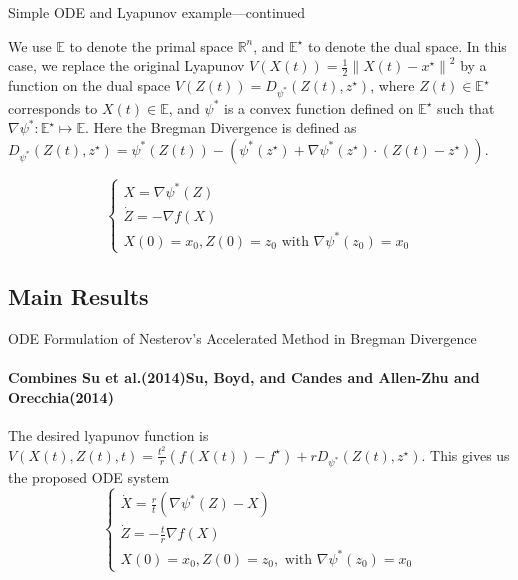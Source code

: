 \documentclass[english]{beamer}
\begin{document}
\begin{frame}{Simple ODE and Lyapunov example---continued}
\begin{block}{}
We use $\mathbb{E}$ to denote the primal space $\mathbb{R}^{n}$, and $\mathbb{E^{\star}}$ to denote the dual space. In this case, we replace the original Lyapunov $V(X(t))=\frac{1}{2}\left\|X(t)-x^{\star}\right\|^{2}$ by a function on the dual space $V(Z(t))=D_{\psi^{*}}\left(Z(t), z^{\star}\right)$, where $Z(t) \in \mathbb{E^{\star}}$ corresponds to $X(t) \in \mathbb{E}$, and $\psi^{*}$ is a convex function defined on $\mathbb{E^{\star}}$ such that $\nabla \psi^{*}: \mathbb{E^{\star}}\mapsto \mathbb{E}$. Here the Bregman Divergence is defined as $D_{\psi^{*}}\left(Z(t), z^{\star}\right) = \psi^{*}(Z(t))-(\psi^{*}(z^{\star})+\nabla \psi^{*}(z^{\star}) \cdot(Z(t)-z^{\star}))$.
\end{block}

\begin{block}{}
\begin{equation*}
    \left\{\begin{array}{l}
    X=\nabla \psi^{*}(Z) \\
    \dot{Z}=-\nabla f(X) \\
    X(0)=x_{0}, Z(0)=z_{0} \text { with } \nabla \psi^{*}\left(z_{0}\right)=x_{0}
    \end{array}\right.
\end{equation*}
\end{block}
\end{frame}

\subsection{Main Results}
\begin{frame}{ODE Formulation of Nesterov's Accelerated Method in Bregman Divergence}
\framesubtitle{Combines Su et al.(2014)Su, Boyd, and Candes and Allen-Zhu and Orecchia(2014)}
\begin{block}{}
The desired lyapunov function is $V(X(t), Z(t), t)=\frac{t^{2}}{r}\left(f(X(t))-f^{\star}\right)+r D_{\psi^{*}}\left(Z(t), z^{\star}\right)$. This gives us the proposed ODE system
$$
\left\{\begin{array}{l}
\dot{X}=\frac{r}{t}\left(\nabla \psi^{*}(Z)-X\right) \\
\dot{Z}=-\frac{t}{r} \nabla f(X) \\
X(0)=x_{0}, Z(0)=z_{0}, \text { with } \nabla \psi^{*}\left(z_{0}\right)=x_{0}
\end{array}\right.
$$
\end{block}
\end{frame}
\end{document}
